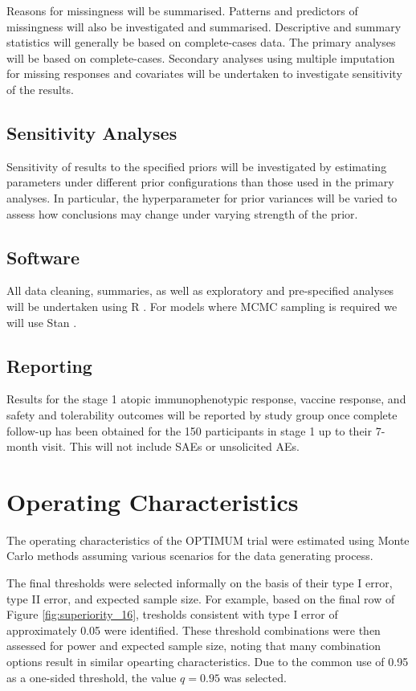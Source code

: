 \documentclass{bmcart}
\begin{document}
Reasons for missingness will be summarised.
Patterns and predictors of missingness will also be investigated and summarised.
Descriptive and summary statistics will generally be based on complete-cases data.
The primary analyses will be based on complete-cases.
Secondary analyses using multiple imputation for missing responses and covariates will be undertaken to investigate sensitivity of the results.

\subsection*{Sensitivity Analyses}

Sensitivity of results to the specified priors will be investigated by estimating parameters under different prior configurations than those used in the primary analyses.
In particular, the hyperparameter for prior variances will be varied to assess how conclusions may change under varying strength of the prior.

\subsection*{Software}

All data cleaning, summaries, as well as exploratory and pre-specified analyses will be undertaken using R \cite{rlang}.
For models where MCMC sampling is required we will use Stan \cite{stanlang}.

\subsection*{Reporting}

Results for the stage 1 atopic immunophenotypic response, vaccine response, and safety and tolerability outcomes will be reported by study group once complete follow-up has been obtained for the 150 participants in stage 1 up to their 7-month visit. This will not include SAEs or unsolicited AEs.

\section*{Operating Characteristics}\label{sec:oc}

The operating characteristics of the OPTIMUM trial were estimated using Monte Carlo methods assuming 
various scenarios for the data generating process.

The final thresholds were selected informally on the basis of their type I error, type II error, and expected sample size.
For example, based on the final row of Figure \ref{fig:superiority_16}, tresholds consistent with type I error of approximately 0.05 were identified.
These threshold combinations were then assessed for power and expected sample size, noting that many combination options result in similar opearting characteristics.
Due to the common use of 0.95 as a one-sided threshold, the value $q=0.95$ was selected.
\end{document}
